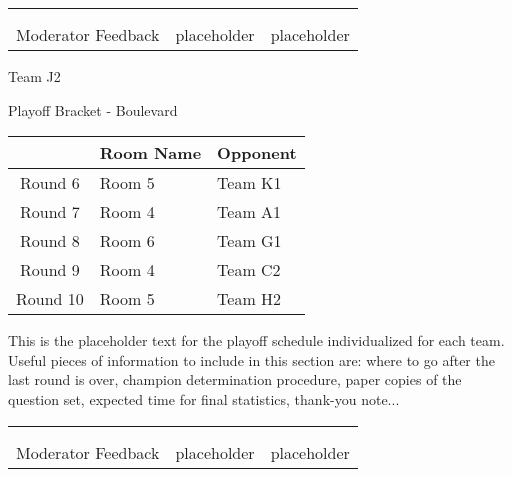 \documentclass{article}%
\begin{document}
\newline%
%
\begin{tabularx}{\textwidth}{YYY}%
  &  &  \\%
\\%
Moderator Feedback&placeholder&placeholder\\%
\end{tabularx}%
\newpage%
\begin{center}%
\begin{Huge}%
Team J2%
\end{Huge}%
\vspace*{12pt}%
\linebreak%
\begin{Large}%
Playoff Bracket {-} Boulevard%
\end{Large}%
\end{center}%
\vspace*{4pt}%
%
\begin{tabularx}{\textwidth}{|c|Y|Y|}%
\hline%
&Room Name&Opponent\\%
\hline%
Round 6&Room 5&Team K1\\%
Round 7&Room 4&Team A1\\%
Round 8&Room 6&Team G1\\%
Round 9&Room 4&Team C2\\%
Round 10&Room 5&Team H2\\%
\hline%
\end{tabularx}%
\vspace*{30pt}%
\linebreak%
This is the placeholder text for the playoff schedule individualized for each team. Useful pieces of information to include in this section are: where to go after the last round is over, champion determination procedure, paper copies of the question set, expected time for final statistics, thank{-}you note...%
\vspace*{30pt}%
\newline%
%
\begin{tabularx}{\textwidth}{YYY}%
  &  &  \\%
\\%
Moderator Feedback&placeholder&placeholder\\%
\end{tabularx}%
\end{document}
